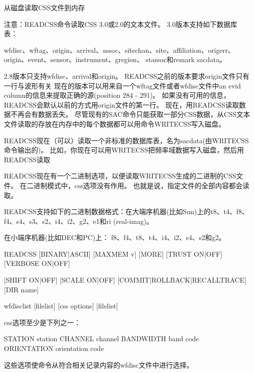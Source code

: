 \label{cmd:readcss}

从磁盘读取CSS文件到内存

注意：READCSS命令读取CSS 3.0或2.0的文本文件。
3.0版本支持如下数据库表：

wfdisc、wftag、origin、arrival、assoc、sitechan、site、affiliation、origerr、origin、event、sensor、instrument、gregion、
stassoc和remark sacdata。

2.8版本只支持wfdisc、arrival和origin。
READCSS之前的版本要求origin文件只有一行与波形有关%
现在的版本可以用来自一个wftag文件或者wfdisc文件中an evid column的信息来提取正确的源(position 284 - 291)。%
如果没有可用的信息，READCSS会默认以前的方式用origin文件的第一行。
现在，用READCSS读取数据不再会有数据丢失。
尽管现有的SAC命令只能获取一部分CSS数据，从CSS文本文件读取的存放在内存中的每个数据都可以用命令WRITECSS写入磁盘。

READCSS现在（可以）读取一个非标准的数据库表，名为sacdata(由WRITECSS命令输出的)。%
比如，你现在可以用WRITECSS把频率域数据写入磁盘，然后用READCSS读取

READCSS现在有一个二进制选项，以便读取WRITECSS生成的二进制的CSS文件。
在二进制模式中，css选项没有作用。
也就是说，指定文件的全部内容都会读取。

READCSS支持如下的二进制数据格式：在大端序机器(比如Sun)上的t8、t4、f8、f4、s4、s3、s2、i4、i2、g2、e1和ri (real-imag)。

在小端序机器(比如DEC和PC)上： f8、f4、t8、t4、i4、i2、s4、s2和g2。

\begin{SACSTX}
READCSS [BINARY|ASCII] [MAXMEM v] [MORE] [TRUST ON|OFF] [VERBOSE ON|OFF] 

[SHIFT ON|OFF] [SCALE ON|OFF] [COMMIT|ROLLBACK|RECALLTRACE] [DIR name] 

wfdisclist [filelist] [css options] [filelist]
\end{SACSTX}

css选项至少是下列之一：

\begin{SACSTX}
STATION station
CHANNEL channel
BANDWIDTH band code
ORIENTATION orientation code
\end{SACSTX}

这些选项使命令从符合相关记录内容的wfdisc文件中进行选择。

